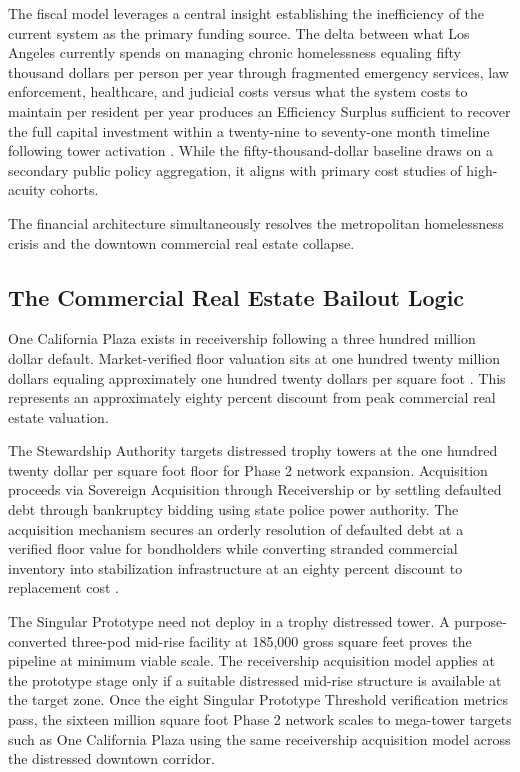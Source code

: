 \documentclass[12pt, letterpaper]{article}
\begin{document}
The fiscal model leverages a central insight establishing the inefficiency of the current system as the primary funding source. The delta between what Los Angeles currently spends on managing chronic homelessness equaling fifty thousand dollars per person per year through fragmented emergency services, law enforcement, healthcare, and judicial costs versus what the system costs to maintain per resident per year produces an Efficiency Surplus sufficient to recover the full capital investment within a twenty-nine to seventy-one month timeline following tower activation \citep{ucsf_bhhi_2023, calmatters_2026}. While the fifty-thousand-dollar baseline draws on a secondary public policy aggregation, it aligns with primary cost studies of high-acuity cohorts.

The financial architecture simultaneously resolves the metropolitan homelessness crisis and the downtown commercial real estate collapse.

\subsection{The Commercial Real Estate Bailout Logic}

One California Plaza exists in receivership following a three hundred million dollar default. Market-verified floor valuation sits at one hundred twenty million dollars equaling approximately one hundred twenty dollars per square foot \citep{globest_2025}. This represents an approximately eighty percent discount from peak commercial real estate valuation.

The Stewardship Authority targets distressed trophy towers at the one hundred twenty dollar per square foot floor for Phase 2 network expansion. Acquisition proceeds via Sovereign Acquisition through Receivership or by settling defaulted debt through bankruptcy bidding using state police power authority. The acquisition mechanism secures an orderly resolution of defaulted debt at a verified floor value for bondholders while converting stranded commercial inventory into stabilization infrastructure at an eighty percent discount to replacement cost \citep{estrada_2026, allwork_2026}.

The Singular Prototype need not deploy in a trophy distressed tower. A purpose-converted three-pod mid-rise facility at 185,000 gross square feet proves the pipeline at minimum viable scale. The receivership acquisition model applies at the prototype stage only if a suitable distressed mid-rise structure is available at the target zone. Once the eight Singular Prototype Threshold verification metrics pass, the sixteen million square foot Phase 2 network scales to mega-tower targets such as One California Plaza using the same receivership acquisition model across the distressed downtown corridor.
\end{document}
